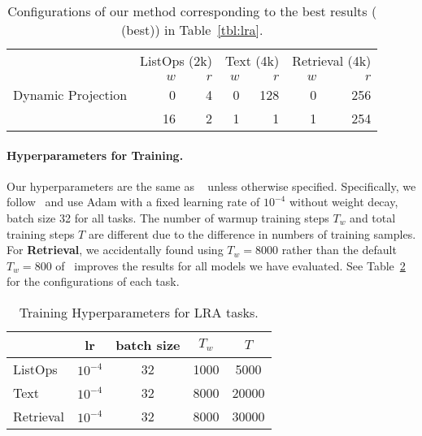 \begin{table}[tbh!]
\centering
\caption{ Configurations of our method corresponding to the best results (\shortname{} (best)) in Table~\ref{tbl:lra}.}\label{tbl:lra_configs}
\begin{tabular}{l|rr|rr|rr}
\toprule
\multirow{2}{*}{ }
& \multicolumn{2}{c|}{ListOps (2k)} & \multicolumn{2}{c|}{Text (4k)} & \multicolumn{2}{c}{Retrieval (4k)} \\


& $w$             & $r$           & $w$          & $r$           & $w$             & $r$             \\
\midrule
Dynamic Projection          & {  0}             & 4           & {  0}          & 128         & 0             & 256           \\
\shortname{}             & 16            & 2           & 1          & 1           &       1        &        254      \\
\bottomrule
\end{tabular}
\end{table}

\paragraph{Hyperparameters for Training.} Our hyperparameters are the same as \nformer{}~\cite{xiong2021nformer} unless otherwise specified. Specifically, we follow~\cite{xiong2021nformer} and use Adam with a fixed learning rate of $10^{-4}$ without weight decay, batch size 32 for all tasks. The number of warmup training steps $T_w$ and total training steps $T$ are different due to the difference in numbers of training samples. For \textbf{Retrieval}, we accidentally found using $T_w=8000$ rather than the default $T_w=800$ of~\cite{xiong2021nformer} improves the results for all models we have evaluated. See Table~\ref{tbl:lra_hparams} for the configurations of each task.
\begin{table}[htbp!]
\centering
\caption{Training Hyperparameters for LRA tasks.}\label{tbl:lra_hparams}
\begin{tabular}{lcccc}
\toprule
          & lr          & batch size & $T_w$   & $T$     \\
\midrule
ListOps   & $10^{-4}$   & 32         & 1000 & 5000  \\
Text      & $10^{-4}$   & 32         & 8000 & 20000 \\
Retrieval & $10^{-4}$   & 32         & 8000 & 30000 \\
\bottomrule
\end{tabular}
\end{table}

